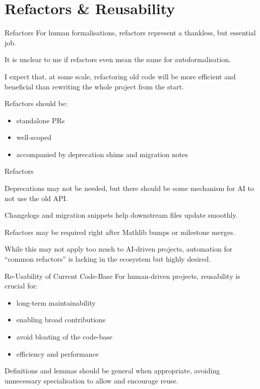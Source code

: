 \documentclass{beamer}
\begin{document}
\section{Refactors \& Reusability}

\begin{frame}{Refactors}
For human formalisations, refactors represent a thankless, but essential job.

\bigskip

It is unclear to me if refactors even mean the same for autoformalisation.

\bigskip

I expect that, at some scale, refactoring old code will be more efficient and beneficial than rewriting the whole project from the start.

\bigskip

Refactors should be:

\medskip

\begin{itemize}
  \item standalone PRs
  \smallskip
  \item well-scoped
  \smallskip
  \item accompanied by deprecation shims and migration notes
\end{itemize}
\end{frame}

\begin{frame}{Refactors}

Deprecations may not be needed, but there should be some mechanism for AI to not use the old API.

\bigskip

Changelogs and migration snippets help downstream files update smoothly.

\bigskip

Refactors may be required right after Mathlib bumps or milestone merges.

\bigskip

While this may not apply too much to AI-driven projects, automation for ``common refactors'' is lacking in the ecosystem but highly desired.

\end{frame}

\begin{frame}{Re-Usability of Current Code-Base}
For human-driven projects, reusability is crucial for:

\medskip

\begin{itemize}
  \item long-term maintainability
  \smallskip
  \item enabling broad contributions
  \smallskip
  \item avoid bloating of the code-base
  \smallskip
  \item efficiency and performance
\end{itemize}

\bigskip

Definitions and lemmas should be general when appropriate, avoiding unnecessary specialisation to allow and encourage reuse.
\end{frame}
\end{document}
